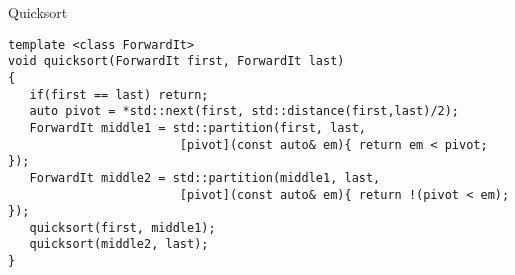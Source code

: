 \documentclass[handout]{beamer}
\begin{document}
\begin{frame}[fragile]{Quicksort}
    \begin{lstlisting}
template <class ForwardIt>
void quicksort(ForwardIt first, ForwardIt last)
{
   if(first == last) return;
   auto pivot = *std::next(first, std::distance(first,last)/2);
   ForwardIt middle1 = std::partition(first, last, 
                        [pivot](const auto& em){ return em < pivot; });
   ForwardIt middle2 = std::partition(middle1, last, 
                        [pivot](const auto& em){ return !(pivot < em); });
   quicksort(first, middle1);
   quicksort(middle2, last);
}
    \end{lstlisting}
\end{frame}
\end{document}
